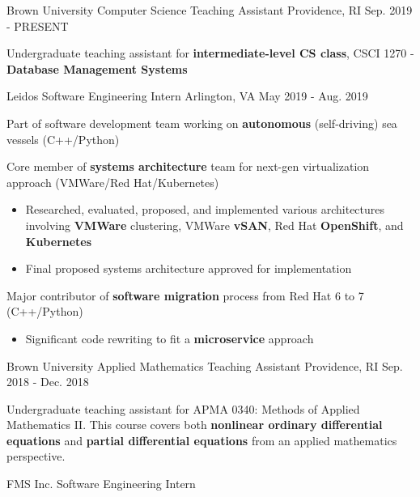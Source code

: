 \begin{cventries}
    \cventry
    {Brown University}
    {Computer Science Teaching Assistant}
	{Providence, RI}
	{Sep. 2019 - PRESENT}
    {
        \begin{cvitems}
		\item{Undergraduate teaching assistant for \textbf{intermediate-level CS class}, CSCI 1270 - \textbf{Database Management Systems}}
        \end{cvitems}
    }
    \cventry
    {Leidos}
    {Software Engineering Intern}
    {Arlington, VA}
    {May 2019 - Aug. 2019}
    {
        \begin{cvitems}
        \item{Part of software development team working on \textbf{autonomous} (self-driving) sea vessels (C++/Python)}
        \item{Core member of \textbf{systems architecture} team for next-gen virtualization approach (VMWare/Red Hat/Kubernetes)}
            \begin{itemize}
                \item{Researched, evaluated, proposed, and implemented various architectures involving \textbf{VMWare} clustering, VMWare \textbf{vSAN}, Red Hat \textbf{OpenShift}, and \textbf{Kubernetes}}
                \item{Final proposed systems architecture approved for implementation}
            \end{itemize}
        \item{Major contributor of \textbf{software migration} process from Red Hat 6 to 7 (C++/Python)}
            \begin{itemize}
                \item{Significant code rewriting to fit a \textbf{microservice} approach}
            \end{itemize}
        \end{cvitems}
    }
    \cventry
	{Brown University}
	{Applied Mathematics Teaching Assistant}
	{Providence, RI}
	{Sep. 2018 - Dec. 2018}
    {
        \begin{cvitems}
		\item{Undergraduate teaching assistant for APMA 0340: Methods of Applied Mathematics II. This course covers both \textbf{nonlinear ordinary differential equations} and \textbf{partial differential equations} from an applied mathematics perspective.}
        \end{cvitems}
    }
    \cventry
	{FMS Inc.}
    {Software Engineering Intern}

\end{cventries}
